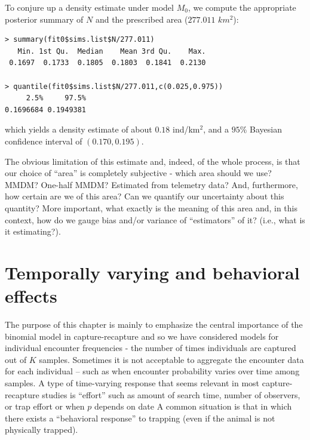 To conjure up a
density estimate under model $M_0$, we compute the appropriate
posterior summary of $N$ and the prescribed area ($277.011$ $km^2$):
\begin{verbatim}
> summary(fit0$sims.list$N/277.011)
   Min. 1st Qu.  Median    Mean 3rd Qu.    Max.
 0.1697  0.1733  0.1805  0.1803  0.1841  0.2130

> quantile(fit0$sims.list$N/277.011,c(0.025,0.975))
     2.5%     97.5%
0.1696684 0.1949381
\end{verbatim}
which yields a density estimate of about $0.18$ ind/km$^2$, and a $95\%$ Bayesian
confidence interval of $(0.170, 0.195)$.

The obvious limitation of this estimate and, indeed, of the whole
process, is that our choice of ``area'' is completely subjective -
which area should we use? MMDM? One-half MMDM? Estimated from
telemetry data? And, furthermore, how certain are we of this area? Can
we quantify our uncertainty about this quantity?
 More important, what exactly is
the meaning of this area and, in this context, how do we gauge bias
and/or variance of ``estimators'' of it? (i.e., what is it
estimating?).

\section{Temporally varying and behavioral effects}

The purpose of this chapter is mainly to emphasize the central
importance of the binomial model in capture-recapture and so we have
considered models for individual encounter frequencies - the number of
times individuals are captured out of $K$ samples.  Sometimes it is
not acceptable to aggregate the encounter data for each individual --
such as when encounter probability varies over time among samples. A
type of time-varying response that seems relevant in most
capture-recapture studies is ``effort'' such as amount of search time,
number of observers, or trap effort
 or when $p$ depends on date
\citep{kery_etal:2010}
  A common situation is that in
which there exists a ``behavioral response'' to trapping (even if the
animal is not physically trapped).


